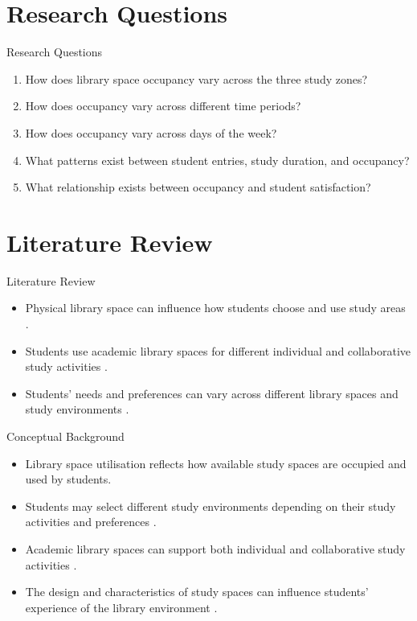 \documentclass[aspectratio=169,11pt]{beamer}
\begin{document}
\section{Research Questions}

\begin{frame}{Research Questions}
    \begin{enumerate}
        \item How does library space occupancy vary across the three study zones?
        \item How does occupancy vary across different time periods?
        \item How does occupancy vary across days of the week?
        \item What patterns exist between student entries, study duration, and occupancy?
        \item What relationship exists between occupancy and student satisfaction?
    \end{enumerate}
\end{frame}

\section{Literature Review}

\begin{frame}{Literature Review}
	\begin{itemize}
		\item Physical library space can influence how students choose and use study areas \parencite{cha2015physical}.
		
		\item Students use academic library spaces for different individual and collaborative study activities \parencite{bedwell2013seeing}.
		
		\item Students' needs and preferences can vary across different library spaces and study environments \parencite{may2015using}.
	\end{itemize}
\end{frame}

\begin{frame}{Conceptual Background}
	\begin{itemize}
		\item Library space utilisation reflects how available study spaces are occupied and used by students.
		
		\item Students may select different study environments depending on their study activities and preferences \parencite{cha2015physical}.
		
		\item Academic library spaces can support both individual and collaborative study activities \parencite{bedwell2013seeing}.
		
		\item The design and characteristics of study spaces can influence students' experience of the library environment \parencite{defrain2020interiors,hegde2018work}.
	\end{itemize}
\end{frame}
\end{document}
